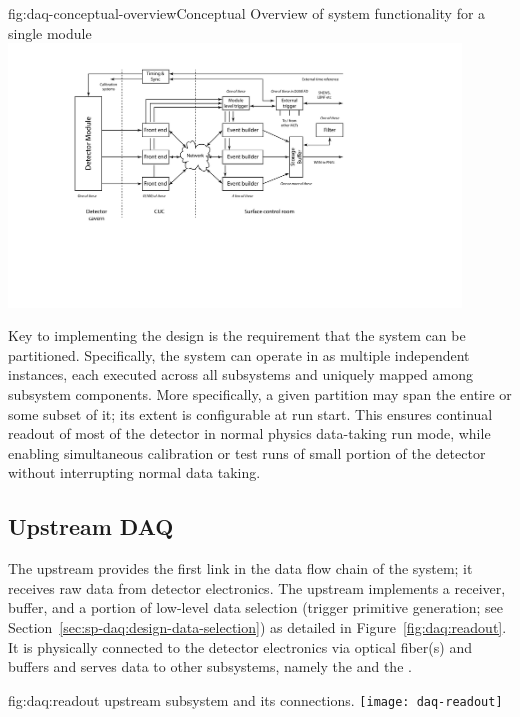 \begin{dunefigure}{fig:daq-conceptual-overview}{Conceptual
   Overview of  system functionality for a single \nominalmodsize module}
  \includegraphics[width=0.9\textwidth]{daq-overview.pdf}
\end{dunefigure}

Key to implementing the  design is the requirement that
the system can be partitioned. Specifically, the system can operate in
as multiple independent  instances, each 
executed across all  subsystems and uniquely mapped among subsystem components. 
More specifically, a given partition may span the entire 
 or some subset of it; its extent is configurable at
run start. This ensures continual readout of most of the detector in normal physics data-taking run mode, while
enabling simultaneous calibration or test runs of small portion of the
detector without interrupting normal data taking. 

\subsection{Upstream DAQ}
\label{sec:daq:design-upstream}

The upstream  provides the first link in the data flow chain of
the  system; it receives raw data from detector electronics.
The upstream  implements a receiver, buffer, and a portion of low-level data
selection (trigger primitive generation; see Section~\ref{sec:sp-daq:design-data-selection}) as detailed in Figure~\ref{fig:daq:readout}.
It is physically connected to the detector electronics via optical
fiber(s) and buffers and serves data to other  subsystems,
namely the  and the .

\begin{dunefigure}{fig:daq:readout}{ upstream  subsystem and its connections.}
  \texttt{[image: daq-readout]}
\end{dunefigure}

